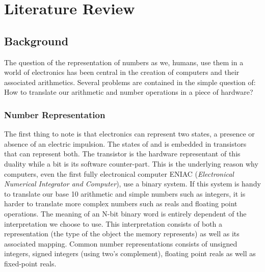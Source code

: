 \chapter{Literature Review} %

\label{Chapter2} %



\section{Background}

The question of the representation of numbers as we, humans, use them in a world of electronics has been central in the creation of computers and their associated arithmetics. Several problems are contained in the simple question of: How to translate our arithmetic and number operations in a piece of hardware?

\subsection{Number Representation}

The first thing to note is that electronics can represent two states, a presence or absence of an electric impulsion. The states of  and  is embedded in transistors that can represent both. The transistor is the hardware representant of this duality while a bit is its software counter-part. This is the underlying reason why computers, even the first fully electronical computer ENIAC (\emph{Electronical Numerical Integrator and Computer}), use a binary system. If this system is handy to translate our base 10 arithmetic and simple numbers such as integers, it is harder to translate more complex numbers such as reals and floating point operations. The meaning of an N-bit binary word is entirely dependent of the interpretation we choose to use. This interpretation consists of both a representation (the type of the object the memory represents) as well as its associated mapping. Common number representations consists of unsigned integers, signed integers (using two's complement), floating point reals as well as fixed-point reals.

